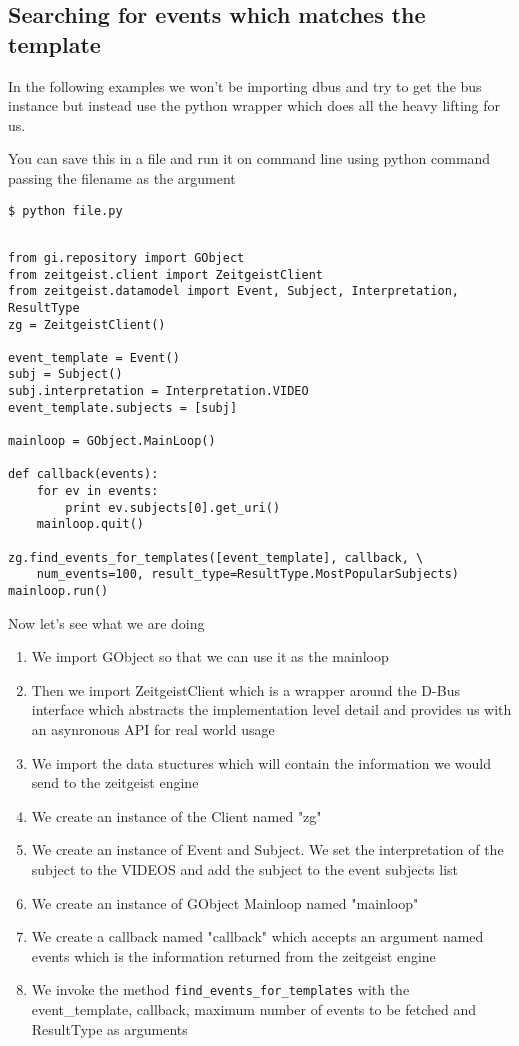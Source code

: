 \subsection{Searching for events which matches the template}

In the following examples we won't be importing dbus and try to get the bus instance 
but instead use the python wrapper which does all the heavy lifting for us.

You can save this in a file and run it on command line using python command passing 
the filename as the argument

\texttt{\$ python file.py}

\begin{center}
\begin{verbatim}

from gi.repository import GObject
from zeitgeist.client import ZeitgeistClient
from zeitgeist.datamodel import Event, Subject, Interpretation, ResultType
zg = ZeitgeistClient()

event_template = Event()
subj = Subject()
subj.interpretation = Interpretation.VIDEO
event_template.subjects = [subj]

mainloop = GObject.MainLoop()

def callback(events):
	for ev in events:
		print ev.subjects[0].get_uri()
	mainloop.quit()

zg.find_events_for_templates([event_template], callback, \
    num_events=100, result_type=ResultType.MostPopularSubjects)
mainloop.run()

\end{verbatim}
\end{center}

Now let's see what we are doing

\begin{enumerate}
\item We import GObject so that we can use it as the mainloop
\item Then we import ZeitgeistClient which is a wrapper around the D-Bus interface 
which abstracts the implementation level detail and provides us with an asynronous 
API for real world usage
\item We import the data stuctures which will contain the information we would 
send to the zeitgeist engine
\item We create an instance of the Client named "zg"
\item We create an instance of Event and Subject. We set the interpretation of the 
subject to the VIDEOS and add the subject to the event subjects list
\item We create an instance of GObject Mainloop named "mainloop"
\item We create a callback named "callback" which accepts an argument named events 
which is the information returned from the zeitgeist engine
\item We invoke the method \texttt{find\_events\_for\_templates} with the event\_template, 
callback, maximum number of events to be fetched and ResultType as arguments
\end{enumerate}